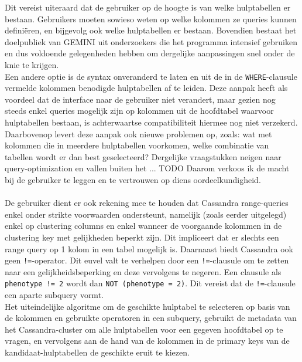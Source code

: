 Dit vereist uiteraard dat de gebruiker op de hoogte is van welke hulptabellen er bestaan. Gebruikers moeten sowieso weten op welke kolommen ze queries kunnen defini\"eren, en bijgevolg ook welke hulptabellen er bestaan. Bovendien bestaat het doelpubliek van GEMINI uit onderzoekers die het programma intensief gebruiken en dus voldoende gelegenheden hebben om dergelijke aanpassingen snel onder de knie te krijgen.\\
Een andere optie is de syntax onveranderd te laten en uit de in de \texttt{WHERE}-clausule vermelde kolommen benodigde hulptabellen af te leiden. Deze aanpak heeft als voordeel dat de interface naar de gebruiker niet verandert, maar gezien nog steeds enkel queries mogelijk zijn op kolommen uit de hoofdtabel waarvoor hulptabellen bestaan, is achterwaartse compatibiliteit hiermee nog niet verzekerd. Daarbovenop levert deze aanpak ook nieuwe problemen op, zoals: wat met kolommen die in meerdere hulptabellen voorkomen, welke combinatie van tabellen wordt er dan best geselecteerd? Dergelijke vraagstukken neigen naar query-optimization en vallen buiten het ... {\color{red} TODO} Daarom verkoos ik de macht bij de gebruiker te leggen en te vertrouwen op diens oordeelkundigheid.\\\\
De gebruiker dient er ook rekening mee te houden dat Cassandra range-queries enkel onder strikte voorwaarden ondersteunt, namelijk (zoals eerder uitgelegd) enkel op clustering columns en enkel wanneer de voorgaande kolommen in de clustering key met gelijkheden beperkt zijn. Dit impliceert dat er slechts een range query op 1 kolom in een tabel mogelijk is. Daarnaast biedt Cassandra ook geen \texttt{!=}-operator. Dit euvel valt te verhelpen door een \texttt{!=}-clausule om te zetten naar een gelijkheidsbeperking en deze vervolgens te negeren. Een clausule als \texttt{phenotype != 2} wordt dan \texttt{NOT (phenotype = 2)}. Dit vereist dat de \texttt{!=}-clausule een aparte subquery vormt.\\

Het uiteindelijke algoritme om de geschikte hulptabel te selecteren op basis van de kolommen en gebruikte operatoren in een subquery, gebruikt de metadata van het Cassandra-cluster om alle hulptabellen voor een gegeven hoofdtabel op te vragen, en vervolgens aan de hand van de kolommen in de primary keys van de kandidaat-hulptabellen de geschikte eruit te kiezen.\\

